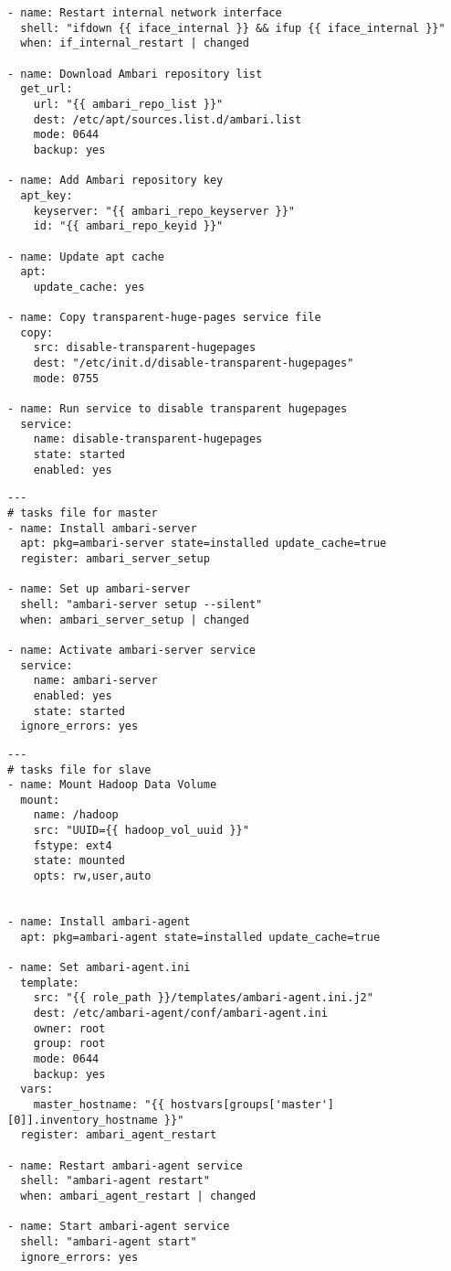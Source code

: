 \begin{lstlisting}[caption={Common tasks in Ansible}, label={lst:ansiblecommon}]
- name: Restart internal network interface
  shell: "ifdown {{ iface_internal }} && ifup {{ iface_internal }}"
  when: if_internal_restart | changed

- name: Download Ambari repository list
  get_url:
    url: "{{ ambari_repo_list }}"
    dest: /etc/apt/sources.list.d/ambari.list
    mode: 0644
    backup: yes

- name: Add Ambari repository key
  apt_key:
    keyserver: "{{ ambari_repo_keyserver }}"
    id: "{{ ambari_repo_keyid }}"

- name: Update apt cache
  apt:
    update_cache: yes

- name: Copy transparent-huge-pages service file
  copy:
    src: disable-transparent-hugepages
    dest: "/etc/init.d/disable-transparent-hugepages"
    mode: 0755

- name: Run service to disable transparent hugepages
  service:
    name: disable-transparent-hugepages
    state: started
    enabled: yes
\end{lstlisting}


\lstset{language=sh}
\begin{lstlisting}[caption={Tasks for the master role in Ansible}, label={lst:ansiblemaster}]
---
# tasks file for master
- name: Install ambari-server
  apt: pkg=ambari-server state=installed update_cache=true
  register: ambari_server_setup

- name: Set up ambari-server
  shell: "ambari-server setup --silent"
  when: ambari_server_setup | changed

- name: Activate ambari-server service
  service:
    name: ambari-server
    enabled: yes
    state: started
  ignore_errors: yes
\end{lstlisting}

\lstset{language=sh}
\begin{lstlisting}[caption={Tasks for the slave role in Ansible}, label={lst:ansibleslave}]
---
# tasks file for slave
- name: Mount Hadoop Data Volume
  mount:
    name: /hadoop
    src: "UUID={{ hadoop_vol_uuid }}"
    fstype: ext4
    state: mounted
    opts: rw,user,auto


- name: Install ambari-agent
  apt: pkg=ambari-agent state=installed update_cache=true

- name: Set ambari-agent.ini
  template:
    src: "{{ role_path }}/templates/ambari-agent.ini.j2"
    dest: /etc/ambari-agent/conf/ambari-agent.ini
    owner: root
    group: root
    mode: 0644
    backup: yes
  vars:
    master_hostname: "{{ hostvars[groups['master'][0]].inventory_hostname }}"
  register: ambari_agent_restart

- name: Restart ambari-agent service
  shell: "ambari-agent restart"
  when: ambari_agent_restart | changed

- name: Start ambari-agent service
  shell: "ambari-agent start"
  ignore_errors: yes
\end{lstlisting}